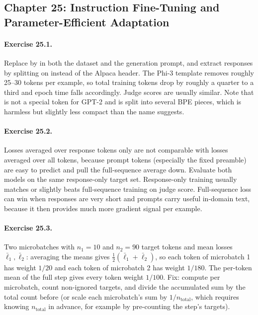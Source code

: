 \subsection*{Chapter 25: Instruction Fine-Tuning and Parameter-Efficient Adaptation}

\paragraph{Exercise 25.1.} Replace  by  in both the
dataset and the generation prompt, and extract responses by splitting on
 instead of the Alpaca header. The Phi-3 template removes roughly
25--30 tokens per example, so total training tokens drop by roughly a quarter to a
third and epoch time falls accordingly. Judge scores are usually similar. Note that
 is not a special token for GPT-2 and is split into several BPE pieces,
which is harmless but slightly less compact than the name suggests.

\paragraph{Exercise 25.2.} Losses averaged over response tokens only are not comparable
with losses averaged over all tokens, because prompt tokens (especially the fixed
preamble) are easy to predict and pull the full-sequence average down. Evaluate both
models on the same response-only target set. Response-only training usually matches or
slightly beats full-sequence training on judge score. Full-sequence loss can win when
responses are very short and prompts carry useful in-domain text, because it then
provides much more gradient signal per example.

\paragraph{Exercise 25.3.} Two microbatches with $n_1=10$ and $n_2=90$ target tokens and
mean losses $\bar\ell_1,\bar\ell_2$: averaging the means gives
$\tfrac12(\bar\ell_1+\bar\ell_2)$, so each token of microbatch 1 has weight $1/20$ and
each token of microbatch 2 has weight $1/180$. The per-token mean of the full step gives
every token weight $1/100$. Fix: compute 
per microbatch, count non-ignored targets, and divide the accumulated sum by the total
count before  (or scale each microbatch's sum by $1/n_{\text{total}}$,
which requires knowing $n_{\text{total}}$ in advance, for example by pre-counting the
step's targets).

